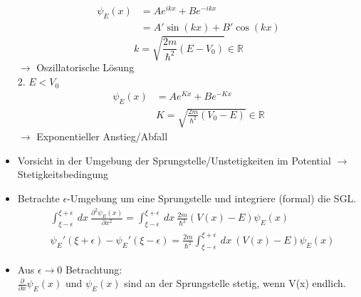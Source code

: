 \documentclass[10pt,article,colorback,accentcolor=tud9d]{scrartcl}
\begin{document}
\begin{itemize}
    \begin{align}
    \psi_E(x)&=Ae^{ikx}+Be^{-ikx}\\
    &=A'\sin(kx)+B'\cos(kx)
    \end{align}
    \begin{equation}
    k=\sqrt{\frac{2m}{\hbar^2}(E-V_0)} \in \mathbb{R}
    \end{equation}
    $\rightarrow$ Oszillatorische Lösung\\
    2. $E<V_0$
    \begin{align}
    \psi_E(x)&=Ae^{K x}+Be^{-K x}\\
    &K=\sqrt{\frac{2m}{\hbar^2}(V_0-E)}\in \mathbb{R}
    \end{align}
    $\rightarrow$ Exponentieller Anstieg/Abfall
  \item Vorsicht in der Umgebung der Sprungstelle/Unstetigkeiten im Potential $\rightarrow$ Stetigkeitsbedingung
  \item Betrachte $\epsilon$-Umgebung um eine Sprungstelle und integriere (formal) die SGL.
    \begin{align}
    &\int_{\xi-\epsilon}^{\xi+\epsilon}\ dx \ \frac{\partial^2\psi_E(x)}{\partial x^2}=\int_{\xi-\epsilon}^{\xi+\epsilon}\ dx \ \frac{2m}{\hbar^2}(V(x)-E)\psi_E(x)\\
    &\psi_E'(\xi+\epsilon)-\psi_E'(\xi-\epsilon)=\frac{2m}{\hbar^2} \int_{\xi-\epsilon}^{\xi+\epsilon}\ dx \ (V(x)-E) \psi_E(x)
    \end{align}
  \item Aus $\epsilon\rightarrow 0$ Betrachtung:\\
    $\frac{\partial}{\partial x}\psi_E(x)$ und $\psi_E(x)$ sind an der Sprungstelle stetig, wenn V(x) endlich.
\end{itemize}
\end{document}
